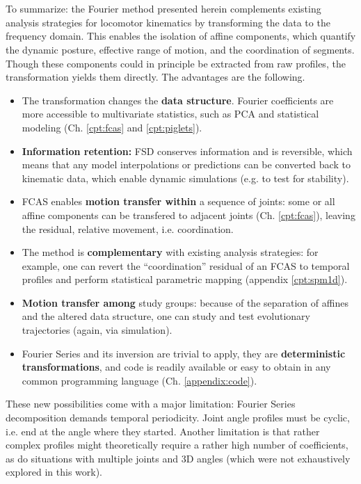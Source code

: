 \section{}
\label{sec:orgc56cc32}
\begin{change}
To summarize: the Fourier method presented herein complements existing analysis strategies for locomotor kinematics by transforming the data to the frequency domain.
This enables the isolation of affine components, which quantify the dynamic posture, effective range of motion, and the coordination of segments.
Though these components could in principle be extracted from raw profiles, the transformation yields them directly.
The advantages are the following.
\begin{itemize}
\item The transformation changes the \textbf{data structure}. Fourier coefficients are more accessible to multivariate statistics, such as PCA and statistical modeling (Ch. \ref{cpt:fcas} and \ref{cpt:piglets}).
\item \textbf{Information retention:} FSD conserves information and is reversible, which means that any model interpolations or predictions can be converted back to kinematic data, which enable dynamic simulations (e.g. to test for stability).
\item FCAS enables \textbf{motion transfer within} a sequence of joints: some or all affine components can be transfered to adjacent joints (Ch. \ref{cpt:fcas}), leaving the residual, relative movement, i.e. coordination.
\item The method is \textbf{complementary} with existing analysis strategies: for example, one can revert the ``coordination'' residual of an FCAS to temporal profiles and perform statistical parametric mapping (appendix \ref{cpt:spm1d}).
\item \textbf{Motion transfer among} study groups: because of the separation of affines and the altered data structure, one can study and test evolutionary trajectories (again, via simulation).
\item Fourier Series and its inversion are trivial to apply, they are \textbf{deterministic transformations}, and code is readily available or easy to obtain in any common programming language (Ch. \ref{appendix:code}).
\end{itemize}


These new possibilities come with a major limitation: Fourier Series decomposition demands temporal periodicity.
Joint angle profiles must be cyclic, i.e. end at the angle where they started.
Another limitation is that rather complex profiles might theoretically require a rather high number of coefficients, as do situations with multiple joints and 3D angles (which were not exhaustively explored in this work).


\end{change}

